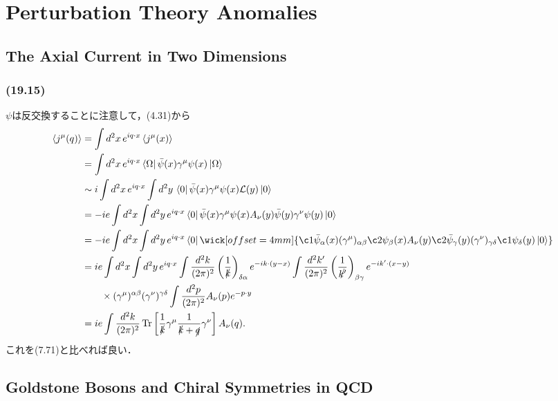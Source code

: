 \chapter{Perturbation Theory Anomalies}
\section{The Axial Current in Two Dimensions}
\subsection{(19.15)}
$\psi$は反交換することに注意して，(4.31)から
\begin{align*}
  \braket{j^\mu(q)} &= \int d^2x \, e^{iq\cdot x} \braket{j^\mu(x)} \\
  &= \int d^2x \, e^{iq\cdot x} \bra\Omega \bar\psi(x) \gamma^\mu \psi(x) \ket\Omega \\
  &\sim i \int d^2x \, e^{iq\cdot x} \int d^2y \, \bra{0} \bar\psi(x) \gamma^\mu \psi(x) \mathcal{L}(y) \ket{0} \\
  &= -ie \int d^2x \int d^2y \, e^{iq\cdot x}
  \bra{0} \bar\psi(x) \gamma^\mu \psi(x) A_\nu(y) \bar\psi(y) \gamma^\nu \psi(y) \ket{0} \\
  &= -ie \int d^2x \int d^2y \, e^{iq\cdot x}
  \bra{0} \wick[offset=4mm]{\c1{\bar\psi}_\alpha(x) (\gamma^\mu)_{\alpha\beta} \c2{\psi}_\beta(x) A_\nu(y)
   \c2{\bar\psi}_\gamma(y) (\gamma^\nu)_{\gamma\delta} \c1{\psi}_\delta(y) \ket{0}} \\
  &= ie \int d^2x \int d^2y \, e^{iq\cdot x}
  \int \frac{d^2k}{(2\pi)^2} \left( \frac{1}{\slashed{k}} \right)_{\delta\alpha} e^{-ik\cdot(y-x)}
  \int \frac{d^2k'}{(2\pi)^2} \left( \frac{1}{\slashed{k'}} \right)_{\beta\gamma} e^{-ik'\cdot(x-y)} \\
  &\qquad\times (\gamma^\mu)^{\alpha\beta} (\gamma^\nu)^{\gamma\delta}
  \int \frac{d^2p}{(2\pi)^2} A_\nu(p) e^{-p\cdot y} \\
  &= ie \int \frac{d^2k}{(2\pi)^2} \Tr\left[ \frac{1}{\slashed{k}} \gamma^\mu \frac{1}{\slashed{k}+\slashed{q}} \gamma^\nu \right] A_\nu(q) .
\end{align*}
これを(7.71)と比べれば良い．

\setcounter{section}{2}
\section{Goldstone Bosons and Chiral Symmetries in QCD}
